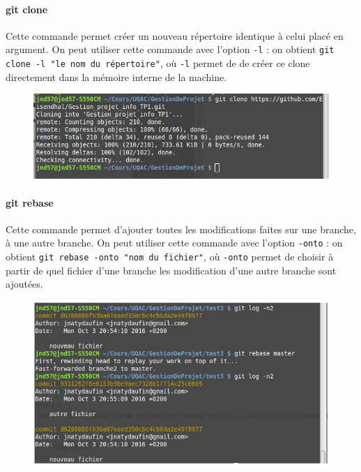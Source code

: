\documentclass[11pt,canadien]{article}
\begin{document}
\paragraph{git clone}Cette commande permet créer un nouveau répertoire identique à celui placé en argument. On peut utiliser cette commande avec l’option \texttt{-l} : on obtient \texttt{git clone -l "le nom du répertoire"}, où \texttt{-l} permet de de créer ce clone directement dans la mémoire interne de la machine.
\begin{figure}[H]
	\centering
	\includegraphics[width=\textwidth]{images/git-clone.png}
\end{figure}

\paragraph{git rebase}Cette commande permet d'ajouter toutes les modifications faites sur une branche, à une autre branche. On peut utiliser cette commande avec l'option \texttt{-onto} : on obtient \texttt{git rebase -onto "nom du fichier"}, où \texttt{-onto} permet de choisir à partir de quel fichier d'une branche les modification d'une autre branche sont ajoutées.
\begin{figure}[H]
	\centering
	\includegraphics[width=\textwidth]{images/git-rebase.png}
\end{figure}
\end{document}
